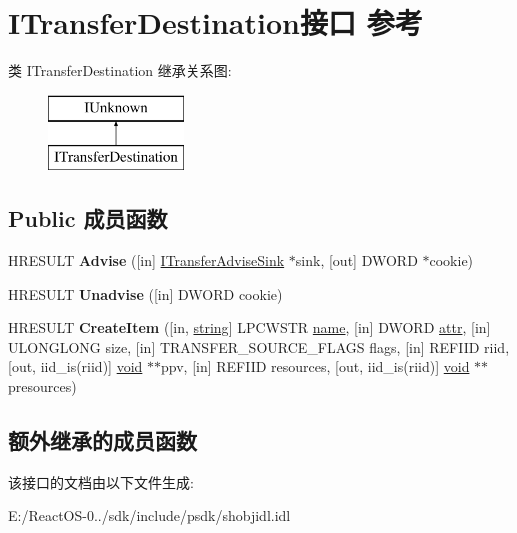 \hypertarget{interface_i_transfer_destination}{}\section{I\+Transfer\+Destination接口 参考}
\label{interface_i_transfer_destination}
类 I\+Transfer\+Destination 继承关系图\+:\begin{figure}[H]
\begin{center}
\leavevmode
\includegraphics[height=2.000000cm]{interface_i_transfer_destination}
\end{center}
\end{figure}
\subsection*{Public 成员函数}
\begin{DoxyCompactItemize}
\item 
\mbox{\label{interface_i_transfer_destination_a8fd16aded4ba4c318902822bc9a9847b}} 
H\+R\+E\+S\+U\+LT {\bfseries Advise} (\mbox{[}in\mbox{]} \hyperlink{interface_i_transfer_advise_sink}{I\+Transfer\+Advise\+Sink} $\ast$sink, \mbox{[}out\mbox{]} D\+W\+O\+RD $\ast$cookie)
\item 
\mbox{\label{interface_i_transfer_destination_ae348c7dfafbfa3682ec53427d28f78af}} 
H\+R\+E\+S\+U\+LT {\bfseries Unadvise} (\mbox{[}in\mbox{]} D\+W\+O\+RD cookie)
\item 
\mbox{\label{interface_i_transfer_destination_a9dbcb49b0f49e183f0041ab971439d53}} 
H\+R\+E\+S\+U\+LT {\bfseries Create\+Item} (\mbox{[}in, \hyperlink{structstring}{string}\mbox{]} L\+P\+C\+W\+S\+TR \hyperlink{structname}{name}, \mbox{[}in\mbox{]} D\+W\+O\+RD \hyperlink{structattr}{attr}, \mbox{[}in\mbox{]} U\+L\+O\+N\+G\+L\+O\+NG size, \mbox{[}in\mbox{]} T\+R\+A\+N\+S\+F\+E\+R\+\_\+\+S\+O\+U\+R\+C\+E\+\_\+\+F\+L\+A\+GS flags, \mbox{[}in\mbox{]} R\+E\+F\+I\+ID riid, \mbox{[}out, iid\+\_\+is(riid)\mbox{]} \hyperlink{interfacevoid}{void} $\ast$$\ast$ppv, \mbox{[}in\mbox{]} R\+E\+F\+I\+ID resources, \mbox{[}out, iid\+\_\+is(riid)\mbox{]} \hyperlink{interfacevoid}{void} $\ast$$\ast$presources)
\end{DoxyCompactItemize}
\subsection*{额外继承的成员函数}


该接口的文档由以下文件生成\+:\begin{DoxyCompactItemize}
\item 
E\+:/\+React\+O\+S-\/0../sdk/include/psdk/shobjidl.\+idl\end{DoxyCompactItemize}
